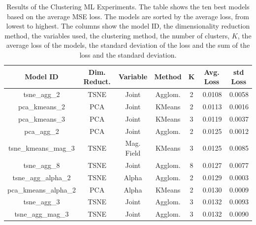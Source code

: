 \begin{table}[]
    \caption[Results of the Clustering ML Experiments]{Results of the Clustering ML Experiments. The table shows the ten best models based on the average MSE loss. The models are sorted by the average loss, from lowest to highest. The columns show the model ID, the dimensionality reduction method, the variables used, the clustering method, the number of clusters, $K$, the average loss of the models, the standard deviation of the loss and the sum of the loss and the standard deviation.}\label{tab:clustering_ml_results}
    \begin{tabular}{@{}cccccrr@{}}
    \toprule
    \textbf{Model ID}     & \textbf{Dim. Reduct.} & \textbf{Variable} & \textbf{Method} & \textbf{K} & \multicolumn{1}{c}{\textbf{Avg. Loss}} & \multicolumn{1}{c}{\textbf{std Loss}} \\ \midrule
    tsne\_agg\_2          & TSNE                  & Joint             & Agglom.         & 2          & 0.0108                                 & 0.0058                                \\
    pca\_kmeans\_2        & PCA                   & Joint             & KMeans          & 2          & 0.0113                                 & 0.0016                                \\
    pca\_kmeans\_3        & PCA                   & Joint             & KMeans          & 3          & 0.0119                                 & 0.0037                                \\
    pca\_agg\_2           & PCA                   & Joint             & Agglom.         & 2          & 0.0125                                 & 0.0012                                \\
    tsne\_kmeans\_mag\_3  & TSNE                  & Mag. Field        & KMeans          & 3          & 0.0125                                 & 0.0085                                \\
    tsne\_agg\_8          & TSNE                  & Joint             & Agglom.         & 8          & 0.0127                                 & 0.0077                                \\
    tsne\_agg\_alpha\_2   & TSNE                  & Alpha             & Agglom.         & 2          & 0.0129                                 & 0.0003                                \\
    pca\_kmeans\_alpha\_2 & PCA                   & Alpha             & KMeans          & 2          & 0.0130                                 & 0.0009                                \\
    tsne\_agg\_3          & TSNE                  & Joint             & Agglom.         & 3          & 0.0132                                 & 0.0093                                \\
    tsne\_agg\_mag\_3     & TSNE                  & Joint             & Agglom.         & 3          & 0.0132                                 & 0.0090                                \\ \bottomrule
    \end{tabular}
\end{table}


